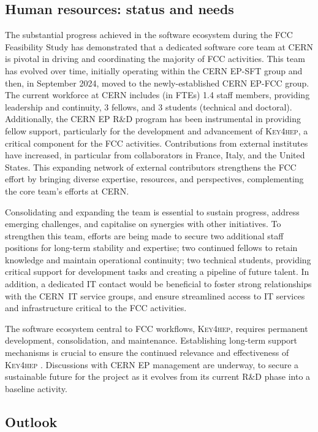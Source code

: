 \subsection{Human resources: status and needs}
\label{sec:humanresource}

The substantial progress achieved in the software ecosystem during the FCC Feasibility Study 
has demonstrated that a dedicated software core team at CERN is pivotal in driving and coordinating the majority of FCC activities. 
This team has evolved over time, initially operating within the CERN EP-SFT group and then, in September 2024, 
moved to the newly-established CERN EP-FCC group. 
The current workforce at CERN includes (in FTEs)
1.4 staff members, providing leadership and continuity, 3 fellows, and 3 students (technical and doctoral).
Additionally, the CERN EP R\&D program has been instrumental in providing fellow support, 
particularly for the development and advancement of \textsc{Key4hep}, a critical component for the FCC activities.
Contributions from external institutes have increased, in particular from collaborators in France, Italy, and the United States. 
This expanding network of external contributors strengthens the FCC effort by bringing diverse expertise, 
resources, and perspectives, complementing the core team’s efforts at CERN.

Consolidating and expanding the team is essential to sustain progress, address emerging challenges, 
and capitalise on synergies with other initiatives. 
To strengthen this team, efforts are being made to secure two additional staff positions for long-term stability and expertise;  
two continued fellows to retain knowledge and maintain operational continuity; 
two technical students, providing critical support for development tasks and creating a pipeline of future talent.
In addition, a dedicated IT contact would be beneficial to foster strong relationships with the CERN~IT service groups, 
and ensure streamlined access to IT services and infrastructure critical to the FCC activities.

The software ecosystem central to FCC workflows, \textsc{Key4hep}, requires permanent development, consolidation, and maintenance. 
Establishing long-term support mechanisms is crucial to ensure the continued relevance and effectiveness of \textsc{Key4hep} . 
Discussions with CERN EP management are underway, 
to secure a sustainable future for the project as it evolves from its current R\&D phase into a baseline activity.

\subsection{Outlook}

